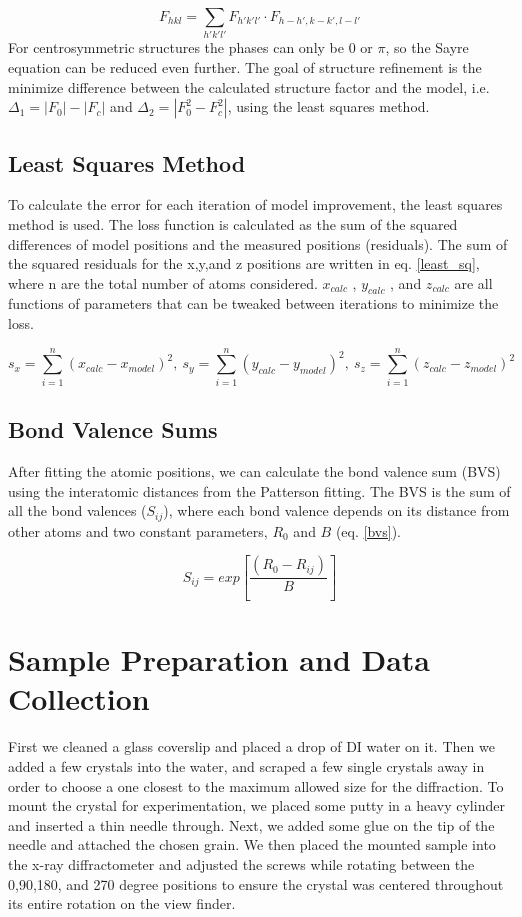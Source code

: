 \documentclass[]{scrartcl}
\begin{document}
\begin{equation}
\label{sayre}
F_{hkl} = \sum_{h'k'l'} F_{h'k'l'} \cdot F_{h-h',k-k',l-l'}
\end{equation}
For centrosymmetric structures the phases can only be 0 or $ \pi $, so the Sayre equation can be reduced even further. The goal of structure refinement is the minimize difference between the calculated structure factor and the model, i.e. $ \Delta_1 = |F_0|-|F_c| $ and $ \Delta_2 = | F_{0}^2 - F_{c}^2 |$, using the least squares method.

\subsection{Least Squares Method}
To calculate the error for each iteration of model improvement, the least squares method is used. The loss function is calculated as the sum of the squared differences of model positions and the measured positions (residuals). The sum of the squared residuals for the x,y,and z positions are written in eq. \ref{least_sq}, where n are the total number of atoms considered. $ x_{calc}$ , $y_{calc}$ , and $z_{calc} $ are all functions of parameters that can be tweaked between iterations to minimize the loss.

\begin{equation}\label{least_sq}
s_x = \sum_{i=1}^n \left(x_{calc} - x_{model}\right)^2, \ s_y = \sum_{i=1}^n \left(y_{calc} - y_{model}\right)^2, \ s_z = \sum_{i=1}^n \left(z_{calc} - z_{model}\right)^2
\end{equation}

\subsection{Bond Valence Sums}
After fitting the atomic positions, we can calculate the bond valence sum (BVS) using the interatomic distances from the Patterson fitting. The BVS is the sum of all the bond valences ($ S_{ij} $), where each bond valence depends on its distance from other atoms and two constant parameters, $ R_0 $ and $ B $  (eq. \ref{bvs}).

\begin{equation}\label{bvs}
S_{ij} = exp\left[\frac{(R_0 - R_{ij})}{B} \right]
\end{equation}

\section{Sample Preparation and Data Collection}
First we cleaned a glass coverslip and placed a drop of DI water on it. Then we added a few crystals into the water, and scraped a few single crystals away in order to choose a one closest to the maximum allowed size for the diffraction. To mount the crystal for experimentation, we placed some putty in a heavy cylinder and inserted a thin needle through. Next, we added some glue on the tip of the needle and attached the chosen grain. We then placed the mounted sample into the x-ray diffractometer and adjusted the screws while rotating between the 0,90,180, and 270 degree positions to ensure the crystal was centered throughout its entire rotation on the view finder. 
\end{document}
